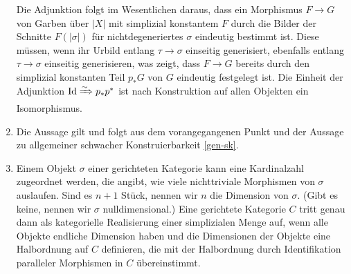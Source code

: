 \begin{enumerate}
  Die Adjunktion folgt im Wesentlichen daraus, dass ein Morphismus $F
  \to G$ von Garben über $|X|$ mit simplizial konstantem $F$ durch die
  Bilder der Schnitte $F(|\sigma|)$ für nichtdegeneriertes $\sigma$
  eindeutig bestimmt ist. Diese müssen, wenn ihr Urbild entlang $\tau
  \to \sigma$ einseitig generisiert, ebenfalls entlang $\tau \to
  \sigma$ einseitig generisieren, was zeigt, dass $F \to G$ bereits
  durch den simplizial konstanten Teil $p_* G$ von $G$ eindeutig
  festgelegt ist. Die Einheit der Adjunktion $\operatorname{Id} \xRightarrow{\sim} p_* p^*$
  ist nach Konstruktion auf allen Objekten ein Isomorphismus.
\item Die Aussage gilt und folgt aus dem vorangegangenen Punkt und der
  Aussage zu allgemeiner schwacher Konstruierbarkeit \ref{gen-sk}.
\item Einem Objekt $\sigma$ einer gerichteten Kategorie kann eine
  Kardinalzahl zugeordnet werden, die angibt, wie viele nichttriviale
  Morphismen von $\sigma$ auslaufen. Sind es $n+1$ Stück, nennen wir
  $n$ die Dimension von $\sigma$. (Gibt es keine, nennen wir $\sigma$
  nulldimensional.) Eine gerichtete Kategorie $C$ tritt genau dann als
  kategorielle Realisierung einer simplizialen Menge auf, wenn alle
  Objekte endliche Dimension haben und die Dimensionen der Objekte
  eine Halbordnung auf $C$ definieren, die mit der Halbordnung durch
  Identifikation paralleler Morphismen in $C$ übereinstimmt.


\end{enumerate}
